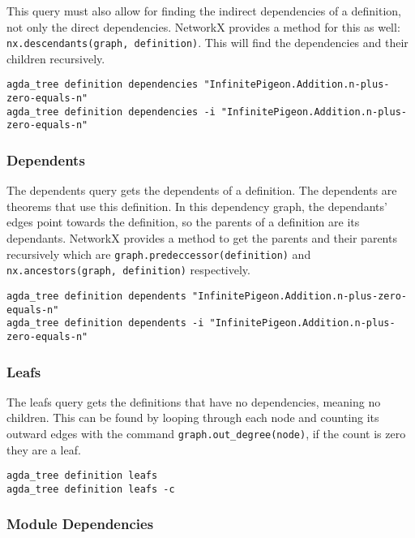 This query must also allow for finding the indirect dependencies of a
definition, not only the direct dependencies. NetworkX provides a method for
this as well: \texttt{nx.descendants(graph, definition)}. This will find the
dependencies and their children recursively.

\begin{lstlisting}
agda_tree definition dependencies "InfinitePigeon.Addition.n-plus-zero-equals-n"
agda_tree definition dependencies -i "InfinitePigeon.Addition.n-plus-zero-equals-n"
\end{lstlisting}

\subsubsection{Dependents}

The dependents query gets the dependents of a definition. The dependents are
theorems that use this definition. In this dependency graph, the dependants'
edges point towards the definition, so the parents of a definition are its
dependants. NetworkX provides a method to get the parents and their parents
recursively which are \texttt{graph.predeccessor(definition)} and
\texttt{nx.ancestors(graph, definition)} respectively.

\begin{lstlisting}
agda_tree definition dependents "InfinitePigeon.Addition.n-plus-zero-equals-n"
agda_tree definition dependents -i "InfinitePigeon.Addition.n-plus-zero-equals-n"
\end{lstlisting}

\subsubsection{Leafs}

The leafs query gets the definitions that have no dependencies, meaning no
children. This can be found by looping through each node and counting its
outward edges with the command \texttt{graph.out\_degree(node)}, if the count
is zero they are a leaf.

\begin{lstlisting}
agda_tree definition leafs
agda_tree definition leafs -c
\end{lstlisting}

\subsubsection{Module Dependencies}

